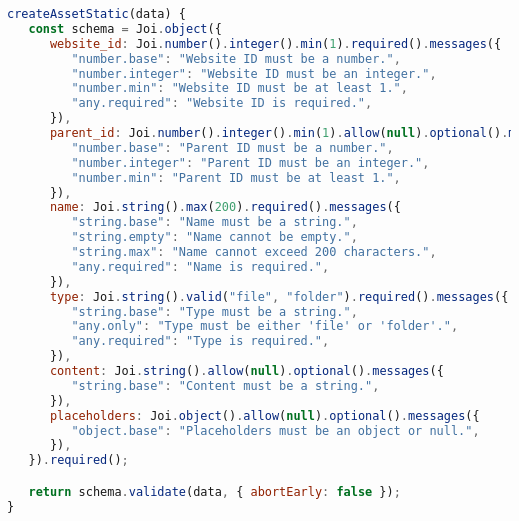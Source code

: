 \begin{lstlisting}[language=Javascript,caption={Validasi Masukan Data Aset Statis}]
createAssetStatic(data) {
   const schema = Joi.object({
      website_id: Joi.number().integer().min(1).required().messages({
         "number.base": "Website ID must be a number.",
         "number.integer": "Website ID must be an integer.",
         "number.min": "Website ID must be at least 1.",
         "any.required": "Website ID is required.",
      }),
      parent_id: Joi.number().integer().min(1).allow(null).optional().messages({
         "number.base": "Parent ID must be a number.",
         "number.integer": "Parent ID must be an integer.",
         "number.min": "Parent ID must be at least 1.",
      }),
      name: Joi.string().max(200).required().messages({
         "string.base": "Name must be a string.",
         "string.empty": "Name cannot be empty.",
         "string.max": "Name cannot exceed 200 characters.",
         "any.required": "Name is required.",
      }),
      type: Joi.string().valid("file", "folder").required().messages({
         "string.base": "Type must be a string.",
         "any.only": "Type must be either 'file' or 'folder'.",
         "any.required": "Type is required.",
      }),
      content: Joi.string().allow(null).optional().messages({
         "string.base": "Content must be a string.",
      }),
      placeholders: Joi.object().allow(null).optional().messages({
         "object.base": "Placeholders must be an object or null.",
      }),
   }).required();

   return schema.validate(data, { abortEarly: false });
}
\end{lstlisting}